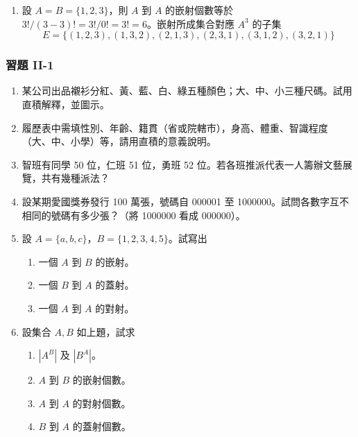 \begin{example}
\begin{enumerate}[label=(\roman*), topsep=2pt, itemsep=4pt]
\begin{figure}[H]
\caption*{圖 2-2}
\label{fig:b5-2-2}
\end{figure}

  \item 設 $A = B = \{1, 2, 3\}$，則 $A$ 到 $A$ 的嵌射個數等於 $3!/(3-3)! = 3!/0! = 3! = 6$。嵌射所成集合對應 $A^3$ 的子集
\[
E = \{(1, 2, 3), (1, 3, 2), (2, 1, 3), (2, 3, 1), (3, 1, 2), (3, 2, 1)\}
\]
\end{enumerate}
\end{example}

\subsubsection*{習題 II-1}\label{sec:b5-ex2-1}

\begin{enumerate}[label=\textbf{\arabic*.}]
  \item 某公司出品襯衫分紅、黃、藍、白、綠五種顏色；大、中、小三種尺碼。試用直積解釋，並圖示。
  \item 履歷表中需填性別、年齡、籍貫（省或院轄市），身高、體重、智識程度（大、中、小學）等，請用直積的意義說明。
  \item 智班有同學 50 位，仁班 51 位，勇班 52 位。若各班推派代表一人籌辦文藝展覽，共有幾種派法？
  \item 設某期愛國獎券發行 100 萬張，號碼自 000001 至 1000000。試問各數字互不相同的號碼有多少張？（將 1000000 看成 000000）。
  \item 設 $A = \{a, b, c\}$，$B = \{1, 2, 3, 4, 5\}$。試寫出
  \begin{enumerate}[label=(\arabic*)]
    \item 一個 $A$ 到 $B$ 的嵌射。
    \item 一個 $B$ 到 $A$ 的蓋射。
    \item 一個 $A$ 到 $A$ 的對射。
  \end{enumerate}
  \item 設集合 $A, B$ 如上題，試求
  \begin{enumerate}[label=(\arabic*)]
    \item $|A^B|$ 及 $|B^A|$。
    \item $A$ 到 $B$ 的嵌射個數。
    \item $A$ 到 $A$ 的對射個數。
    \item $B$ 到 $A$ 的蓋射個數。
  \end{enumerate}
\end{enumerate}

